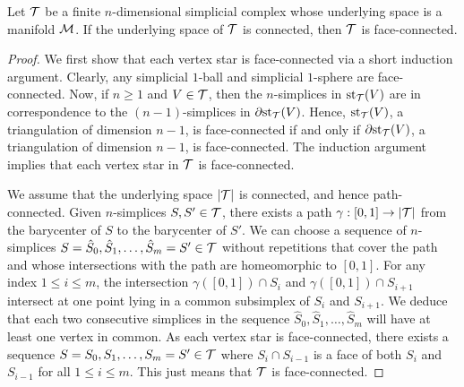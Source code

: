\documentclass[10pt,a4paper]{article}
\begin{document}
\begin{lemma}\label{lemma:connectivity}
    Let ${\mathcal T}$ be a finite $n$-dimensional simplicial complex whose underlying space is a manifold ${\mathcal M}$.
    If the underlying space of ${\mathcal T}$ is connected, then ${\mathcal T}$ is face-connected.
\end{lemma}
\begin{proof}
    We first show that each vertex star is face-connected via a short induction argument.
    Clearly, any simplicial $1$-ball and simplicial $1$-sphere are face-connected. 
    Now, if $n \geq 1$ and $V \in {\mathcal T}$,
    then the $n$-simplices in $\operatorname{st}_{{\mathcal T}}(V)$ are in correspondence to the $(n-1)$-simplices in ${\partial \rm st}_{{\mathcal T}}(V)$.
    Hence, $\operatorname{st}_{{\mathcal T}}(V)$, a triangulation of dimension $n-1$, is face-connected if and only if ${\partial \rm st}_{{\mathcal T}}(V)$, a triangulation of dimension $n-1$, is face-connected.
    The induction argument implies that each vertex star in ${\mathcal T}$ is face-connected.

    
    We assume that the underlying space $\left| {\mathcal T} \right|$ is connected, and hence path-connected. 
    Given $n$-simplices $S,S' \in {\mathcal T}$, 
    there exists a path $\gamma : [0,1] \rightarrow \left| {\mathcal T} \right|$ from the barycenter of $S$ to the barycenter of $S'$.
    We can choose a sequence of $n$-simplices $S = \hat S_0,\hat S_1,\dots,\hat S_m=S' \in {\mathcal T}$ without repetitions 
    that cover the path and whose intersections with the path are homeomorphic to $[0,1]$.
    For any index $1 \leq i \leq m$, 
    the intersection $\gamma([0,1]) \cap S_{i}$ and $\gamma([0,1]) \cap S_{i+1}$ intersect at one point lying in a common subsimplex of $S_{i}$ and $S_{i+1}$.
    We deduce that each two consecutive simplices in the sequence $\hat S_0,\hat S_1,\dots,\hat S_m$ will have at least one vertex in common. 
    As each vertex star is face-connected, 
    there exists a sequence $S=S_0,S_1,\dots,S_{m}=S' \in {\mathcal T}$ 
    where $S_{i} \cap S_{i-1}$ is a face of both $S_{i}$ and $S_{i-1}$ for all $1 \leq i \leq m$.
    This just means that ${\mathcal T}$ is face-connected. 
\end{proof}
\end{document}
